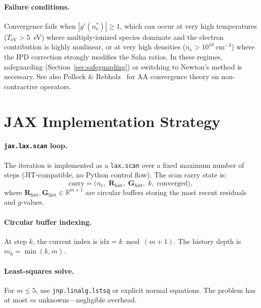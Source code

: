 \documentclass[11pt]{article}
\newcommand{\ne}{n_\mathrm{e}}
\newcommand{\TeV}{T_\mathrm{eV}}
\begin{document}
\paragraph{Failure conditions.}
Convergence fails when $|g'(\ne^*)| \ge 1$, which can occur at very
high temperatures ($\TeV > 5$~eV) where multiply-ionized species
dominate and the electron contribution is highly nonlinear, or at very
high densities ($\ne > 10^{18}~\mathrm{cm}^{-3}$) where the IPD
correction strongly modifies the Saha ratios.  In these regimes,
safeguarding (Section~\ref{sec:safeguarding}) or switching to Newton's
method is necessary.  See also Pollock \&
Rebholz~\cite{pollock-rebholz-2019} for AA convergence theory on
non-contractive operators.


\section{JAX Implementation Strategy}
\label{sec:jax}

\paragraph{\texttt{jax.lax.scan} loop.}
The iteration is implemented as a \texttt{lax.scan} over a fixed maximum
number of steps (JIT-compatible, no Python control flow).  The scan
carry state is:
%
\begin{equation}
  \label{eq:scan-carry}
  \text{carry} = \bigl(\ne,\;
    \mathbf{R}_\mathrm{hist},\;
    \mathbf{G}_\mathrm{hist},\;
    k,\;
    \text{converged}\bigr),
\end{equation}
%
where $\mathbf{R}_\mathrm{hist}, \mathbf{G}_\mathrm{hist} \in \mathbb{R}^{m+1}$
are circular buffers storing the most recent residuals and $g$-values.

\paragraph{Circular buffer indexing.}
At step $k$, the current index is $\text{idx} = k \bmod (m+1)$.  The
history depth is $m_k = \min(k, m)$.

\paragraph{Least-squares solve.}
For $m \le 5$, use \texttt{jnp.linalg.lstsq} or explicit normal
equations.  The problem has at most $m$ unknowns---negligible overhead.
\end{document}
